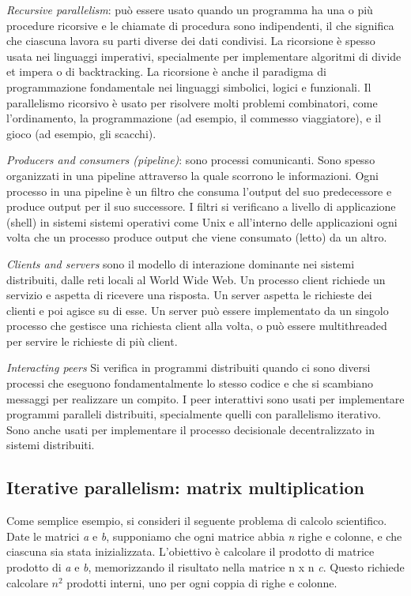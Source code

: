 \documentclass[10pt,a4paper]{book}
\begin{document}
\textit{Recursive parallelism}: può essere usato quando un programma ha una o più procedure ricorsive e le chiamate di procedura sono indipendenti, il che significa che ciascuna lavora su parti diverse dei dati condivisi. La ricorsione è spesso usata nei linguaggi imperativi, specialmente per implementare algoritmi di divide et impera o di backtracking. La ricorsione è anche il paradigma di programmazione fondamentale nei linguaggi simbolici, logici e funzionali. Il parallelismo ricorsivo è usato per risolvere molti problemi combinatori, come l'ordinamento, la programmazione (ad esempio, il commesso viaggiatore), e il gioco (ad esempio, gli scacchi).

\textit{Producers and consumers (pipeline)}: sono processi comunicanti. Sono spesso organizzati in una pipeline attraverso la quale scorrono le informazioni. Ogni processo in una pipeline è un filtro che consuma l'output del suo predecessore e produce output per il suo successore. I filtri si verificano a livello di applicazione (shell) in sistemi sistemi operativi come Unix e all'interno delle applicazioni ogni volta che un processo produce output che viene consumato (letto) da un altro.

\textit{Clients and servers} sono il modello di interazione dominante nei sistemi distribuiti, dalle reti locali al World Wide Web. Un processo client richiede un servizio e aspetta di ricevere una risposta. Un server aspetta le richieste dei clienti e poi agisce su di esse. Un server può essere implementato da un singolo processo che gestisce una richiesta client alla volta, o può essere multithreaded per servire le richieste di più client. 

\textit{Interacting peers} Si verifica in programmi distribuiti quando ci sono diversi processi che eseguono fondamentalmente lo stesso codice e che si scambiano messaggi per realizzare un compito. I peer interattivi sono usati per implementare programmi paralleli distribuiti, specialmente quelli con  parallelismo iterativo. Sono anche usati per implementare il processo decisionale decentralizzato in sistemi distribuiti.

\subsection{Iterative parallelism: matrix multiplication}
Come semplice esempio, si consideri il seguente problema di calcolo scientifico. Date le matrici \textit{a} e \textit{b}, supponiamo che ogni matrice abbia \textit{n} righe e colonne, e che ciascuna sia stata inizializzata. L'obiettivo è calcolare il prodotto di matrice prodotto di \textit{a} e \textit{b}, memorizzando il risultato nella matrice n x n \textit{c}. Questo richiede calcolare $ n^{2} $ prodotti interni, uno per ogni coppia di righe e colonne.
\end{document}
